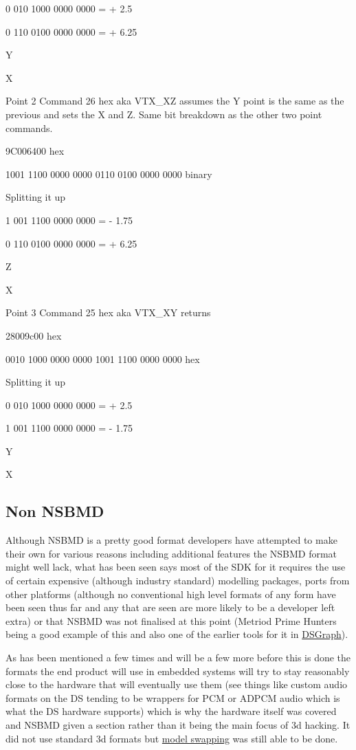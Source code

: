 \documentclass[
]{book}
\begin{document}
0 010 1000 0000 0000 = + 2.5

0 110 0100 0000 0000 = + 6.25

Y

X

Point 2 Command 26 hex aka VTX\_XZ assumes the Y point is the same as the previous and sets the X and Z. Same bit breakdown as the other two point commands.

9C006400 hex

1001 1100 0000 0000 0110 0100 0000 0000 binary

Splitting it up

1 001 1100 0000 0000 = - 1.75

0 110 0100 0000 0000 = + 6.25

Z

X

Point 3 Command 25 hex aka VTX\_XY returns

28009c00 hex

0010 1000 0000 0000 1001 1100 0000 0000 hex

Splitting it up

0 010 1000 0000 0000 = + 2.5

1 001 1100 0000 0000 = - 1.75

Y

X

\hypertarget{non-nsbmd}{%
\subsection{Non NSBMD}\label{non-nsbmd}}

Although NSBMD is a pretty good format developers have attempted to make their own for various reasons including additional features the NSBMD format might well lack, what has been seen says most of the SDK for it requires the use of certain expensive (although industry standard) modelling packages, ports from other platforms (although no conventional high level formats of any form have been seen thus far and any that are seen are more likely to be a developer left extra) or that NSBMD was not finalised at this point (Metriod Prime Hunters being a good example of this and also one of the earlier tools for it in \href{http://filetrip.net/nds-downloads/utilities/download-dsgraph-10-f29517.html}{DSGraph}).

As has been mentioned a few times and will be a few more before this is done the formats the end product will use in embedded systems will try to stay reasonably close to the hardware that will eventually use them (see things like custom audio formats on the DS tending to be wrappers for PCM or ADPCM audio which is what the DS hardware supports) which is why the hardware itself was covered and NSBMD given a section rather than it being the main focus of 3d hacking. It did not use standard 3d formats but \href{http://gbatemp.net/topic/109587-model-swapping-in-soma-bringer/}{model swapping} was still able to be done.
\end{document}
